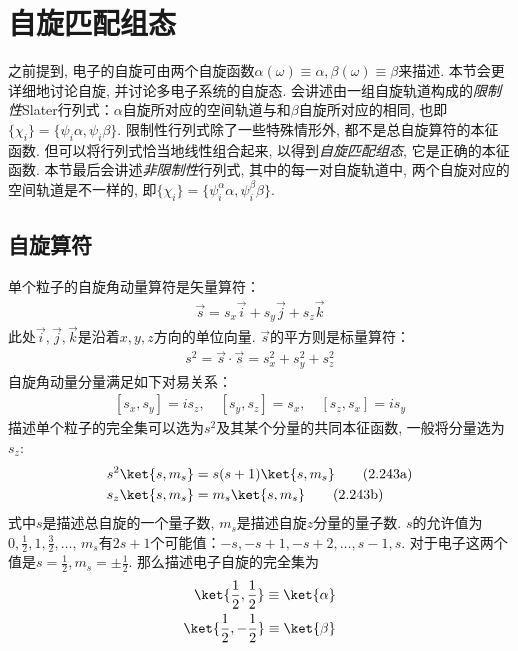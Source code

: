 \section{自旋匹配组态}
\label{sec2.5}
之前提到, 
电子的自旋可由两个自旋函数$\alpha(\omega) \equiv \alpha, \beta(\omega) \equiv \beta$来描述. 
本节会更详细地讨论自旋, 
并讨论多电子系统的自旋态. 
会讲述由一组自旋轨道构成的\emph{限制性}Slater行列式：$\alpha$自旋所对应的空间轨道与和$\beta$自旋所对应的相同, 
也即$\{\chi_i\} = \{\psi_i\alpha,\psi_i\beta\}$. 
限制性行列式除了一些特殊情形外, 
都不是总自旋算符的本征函数. 
但可以将行列式恰当地线性组合起来, 
以得到\emph{自旋匹配组态}, 
它是正确的本征函数. 
本节最后会讲述\emph{非限制性}行列式, 
其中的每一对自旋轨道中, 
两个自旋对应的空间轨道是不一样的, 
即$\{\chi_i\} = \{\psi_i^\alpha\alpha,\psi_i^\beta\beta\}$.

\subsection{自旋算符}
\label{sec2.5.1}
单个粒子的自旋角动量算符是矢量算符：
\begin{align}
\vec{s} = s_x\vec{i} + s_y\vec{j} + s_z\vec{k}
\end{align}
此处$\vec{i},\vec{j},\vec{k}$是沿着$x,y,z$方向的单位向量. 
$\vec{s}$的平方则是标量算符：
\begin{align}\label{eq:2.241}
s^2 = \vec{s}\cdot\vec{s} = s^2_x + s^2_y + s^2_z
\end{align}
自旋角动量分量满足如下对易关系：
\begin{align}\label{eq:2.242}
[s_x,s_y] = is_z,\quad [s_y,s_z] = s_x,\quad [s_z,s_x]=is_y
\end{align}
描述单个粒子的完全集可以选为$s^2$及其某个分量的共同本征函数, 
一般将分量选为$s_z$:
\begin{subequations}
	\begin{align}
	s^2\ket{s,m_s} & = s(s+1)\ket{s,m_s}\tag{2.243a}\\
	s_z\ket{s,m_s} & = m_s\ket{s,m_s}\tag{2.243b}
	\end{align}
\end{subequations}
式中$s$是描述总自旋的一个量子数, 
$m_s$是描述自旋$z$分量的量子数. 
$s$的允许值为$0,\frac{1}{2},1,\frac{3}{2},\ldots$, 
$m_s$有$2s+1$个可能值：$-s,-s+1,-s+2,\ldots,s-1,s$. 
对于电子这两个值是$s=\frac{1}{2},m_s=\pm\frac{1}{2}$. 
那么描述电子自旋的完全集为
\begin{subequations}
	\begin{align}
	\ket{\frac{1}{2},\frac{1}{2}} \equiv \ket{\alpha}\\
	\ket{\frac{1}{2},-\frac{1}{2}} \equiv \ket{\beta}
	\end{align}
\end{subequations}
